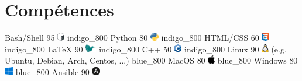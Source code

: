 \documentclass[
  paper=a4,
  fontsize=10pt
]{resume}
\begin{document}
{  \section[\nerdfont]{Compétences}
      \skill%
        {Bash/Shell}%
        {95}%
        {\includegraphics[height=1em]{skill/bash.png}}%
        {}%
        {indigo_800}
      \skill%
        {Python}%
        {80}%
        {\includegraphics[height=1em]{skill/python.png}}%
        {}%
        {indigo_800}
      \skill%
        {HTML/CSS}%
        {60}%
        {\includegraphics[height=1em]{skill/html_css.png}}%
        {}%
        {indigo_800}
      \skill%
        {LaTeX}%
        {90}%
        {\includegraphics[height=1em]{skill/latex.png}}%
        {}%
        {indigo_800}
      \skill%
        {C++}%
        {50}%
        {\includegraphics[height=1em]{skill/cpp.png}}%
        {}%
        {indigo_800}
      \skill%
        {Linux}%
        {90}%
        {\includegraphics[height=1em]{skill/linux.png}}%
        {(e.g. Ubuntu, Debian, Arch, Centos, ...)}%
        {blue_800}
      \skill%
        {MacOS}%
        {80}%
        {\includegraphics[height=1em]{skill/apple.png}}%
        {}%
        {blue_800}
      \skill%
        {Windows}%
        {80}%
        {\includegraphics[height=1em]{skill/windows.png}}%
        {}%
        {blue_800}
      \skill%
        {Ansible}%
        {90}%
        {\includegraphics[height=1em]{skill/ansible.png}}%
}
\end{document}
